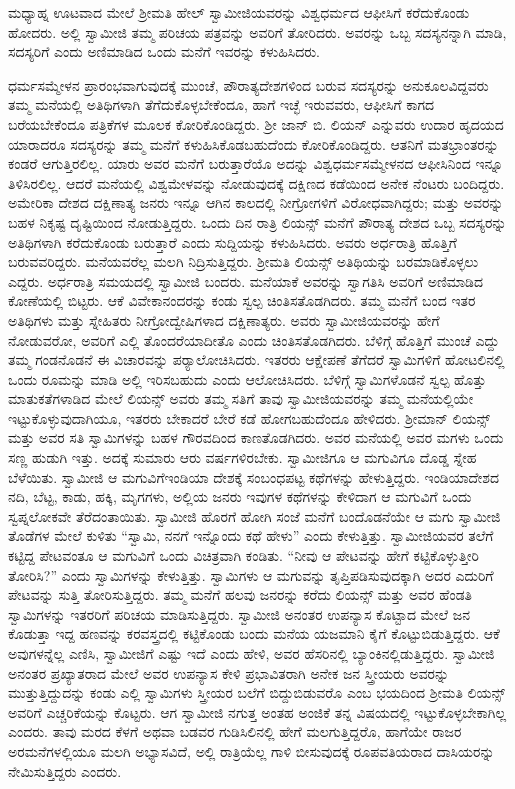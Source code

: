  ಮಧ್ಯಾಹ್ನ ಊಟವಾದ ಮೇಲೆ ಶ‍್ರೀಮತಿ ಹೇಲ್ ಸ್ವಾಮೀಜಿಯವರನ್ನು ವಿಶ್ವಧರ್ಮದ ಆಫೀಸಿಗೆ ಕರೆದುಕೊಂಡು ಹೋದರು. ಅಲ್ಲಿ ಸ್ವಾಮೀಜಿ ತಮ್ಮ ಪರಿಚಯ ಪತ್ರವನ್ನು ಅವರಿಗೆ ತೋರಿದರು. ಅವರನ್ನು ಒಬ್ಬ ಸದಸ್ಯನನ್ನಾಗಿ ಮಾಡಿ, ಸದಸ್ಯರಿಗೆ ಎಂದು ಅಣಿಮಾಡಿದ ಒಂದು ಮನೆಗೆ ಇವರನ್ನು ಕಳುಹಿಸಿದರು. 

 ಧರ್ಮಸಮ್ಮೇಳನ ಪ್ರಾರಂಭವಾಗುವುದಕ್ಕೆ ಮುಂಚೆ, ಪೌರಾತ್ಯದೇಶಗಳಿಂದ ಬರುವ ಸದಸ್ಯರನ್ನು ಅನುಕೂಲವಿದ್ದವರು ತಮ್ಮ ಮನೆಯಲ್ಲಿ ಅತಿಥಿಗಳಾಗಿ ತೆಗೆದುಕೊಳ್ಳಬೇಕೆಂದೂ, ಹಾಗೆ ಇಚ್ಛೆ ಇರುವವರು, ಆಫೀಸಿಗೆ ಕಾಗದ ಬರೆಯಬೇಕೆಂದೂ ಪತ್ರಿಕೆಗಳ ಮೂಲಕ ಕೋರಿಕೊಂಡಿದ್ದರು. ಶ‍್ರೀ ಜಾನ್ ಬಿ. ಲಿಯನ್ ಎನ್ನುವರು ಉದಾರ ಹೃದಯದ ಯಾರಾದರೂ ಸದಸ್ಯರನ್ನು ತಮ್ಮ ಮನೆಗೆ ಕಳುಹಿಸಿಕೊಡಬಹುದೆಂದು ಕೋರಿಕೊಂಡಿದ್ದರು. ಆತನಿಗೆ ಮತಭ್ರಾಂತರನ್ನು ಕಂಡರೆ ಆಗುತ್ತಿರಲಿಲ್ಲ. ಯಾರು ಅವರ ಮನೆಗೆ ಬರುತ್ತಾರೆಯೊ ಅದನ್ನು ವಿಶ್ವಧರ್ಮಸಮ್ಮೇಳನದ ಆಫೀಸಿನಿಂದ ಇನ್ನೂ ತಿಳಿಸಿರಲಿಲ್ಲ. ಆದರೆ ಮನೆಯಲ್ಲಿ ವಿಶ್ವಮೇಳವನ್ನು ನೋಡುವುದಕ್ಕೆ ದಕ್ಷಿಣದ ಕಡೆಯಿಂದ ಅನೇಕ ನೆಂಟರು ಬಂದಿದ್ದರು. ಅಮೇರಿಕಾ ದೇಶದ ದಕ್ಷಿಣಾತ್ಯ ಜನರು ಇನ್ನೂ ಆಗಿನ ಕಾಲದಲ್ಲಿ ನೀಗ್ರೋಗಳಿಗೆ ವಿರೋಧವಾಗಿದ್ದರು; ಮತ್ತು ಅವರನ್ನು ಬಹಳ ನಿಕೃಷ್ಟ ದೃಷ್ಟಿಯಿಂದ ನೋಡುತ್ತಿದ್ದರು. ಒಂದು ದಿನ ರಾತ್ರಿ ಲಿಯನ್ಸ್ ಮನೆಗೆ ಪೌರಾತ್ಯ ದೇಶದ ಒಬ್ಬ ಸದಸ್ಯರನ್ನು ಅತಿಥಿಗಳಾಗಿ ಕರೆದುಕೊಂಡು ಬರುತ್ತಾರೆ ಎಂದು ಸುದ್ದಿಯನ್ನು ಕಳುಹಿಸಿದರು. ಅವರು ಅರ್ಧರಾತ್ರಿ ಹೊತ್ತಿಗೆ ಬರುವವರಿದ್ದರು. ಮನೆಯವರೆಲ್ಲ ಮಲಗಿ ನಿದ್ರಿಸುತ್ತಿದ್ದರು. ಶ‍್ರೀಮತಿ ಲಿಯನ್ಸ್ ಅತಿಥಿಯನ್ನು ಬರಮಾಡಿಕೊಳ್ಳಲು ಎದ್ದರು. ಅರ್ಧರಾತ್ರಿ ಸಮಯದಲ್ಲಿ ಸ್ವಾಮೀಜಿ ಬಂದರು. ಮನೆಯಾಕೆ ಅವರನ್ನು ಸ್ವಾಗತಿಸಿ ಅವರಿಗೆ ಅಣಿಮಾಡಿದ ಕೋಣೆಯಲ್ಲಿ ಬಿಟ್ಟರು. ಆಕೆ ವಿವೇಕಾನಂದರನ್ನು ಕಂಡು ಸ್ವಲ್ಪ ಚಿಂತಿಸತೊಡಗಿದರು. ತಮ್ಮ ಮನೆಗೆ ಬಂದ ಇತರ ಅತಿಥಿಗಳು ಮತ್ತು ಸ್ನೇಹಿತರು ನೀಗ್ರೋದ್ವೇಷಿಗಳಾದ ದಕ್ಷಿಣಾತ್ಯರು. ಅವರು ಸ್ವಾಮೀಜಿಯವರನ್ನು ಹೇಗೆ ನೋಡುವರೋ, ಅವರಿಗೆ ಎಲ್ಲಿ ತೊಂದರೆಯಾದೀತೊ ಎಂದು ಚಿಂತಿಸತೊಡಗಿದರು. ಬೆಳಿಗ್ಗೆ ಹೊತ್ತಿಗೆ ಮುಂಚೆ ಎದ್ದು ತಮ್ಮ ಗಂಡನೊಡನೆ ಈ ವಿಚಾರವನ್ನು ಪರ‍್ಯಾಲೋಚಿಸಿದರು. ಇತರರು ಆಕ್ಷೇಪಣೆ ತೆಗೆದರೆ ಸ್ವಾಮಿಗಳಿಗೆ ಹೋಟಲಿನಲ್ಲಿ ಒಂದು ರೂಮನ್ನು ಮಾಡಿ ಅಲ್ಲಿ ಇರಿಸಬಹುದು ಎಂದು ಆಲೋಚಿಸಿದರು. ಬೆಳಿಗ್ಗೆ ಸ್ವಾಮಿಗಳೊಡನೆ ಸ್ವಲ್ಪ ಹೊತ್ತು ಮಾತುಕತೆಗಳಾಡಿದ ಮೇಲೆ ಲಿಯನ್ಸ್ ಅವರು ತಮ್ಮ ಸತಿಗೆ ತಾವು ಸ್ವಾಮೀಜಿಯವರನ್ನು ತಮ್ಮ ಮನೆಯಲ್ಲಿಯೇ ಇಟ್ಟುಕೊಳ್ಳುವುದಾಗಿಯೂ, ಇತರರು ಬೇಕಾದರೆ ಬೇರೆ ಕಡೆ ಹೋಗಬಹುದೆಂದೂ ಹೇಳಿದರು. ಶ‍್ರೀಮಾನ್ ಲಿಯನ್ಸ್ ಮತ್ತು ಅವರ ಸತಿ ಸ್ವಾಮಿಗಳನ್ನು ಬಹಳ ಗೌರವದಿಂದ ಕಾಣತೊಡಗಿದರು. ಅವರ ಮನೆಯಲ್ಲಿ ಅವರ ಮಗಳು ಒಂದು ಸಣ್ಣ ಹುಡುಗಿ ಇತ್ತು. ಅದಕ್ಕೆ ಸುಮಾರು ಆರು ವರ್ಷಗಳಿರಬೇಕು. ಸ್ವಾಮೀಜಿಗೂ ಆ ಮಗುವಿಗೂ ದೊಡ್ಡ ಸ್ನೇಹ ಬೆಳೆಯಿತು. ಸ್ವಾಮೀಜಿ ಆ ಮಗುವಿಗೆ\break ಇಂಡಿಯಾ ದೇಶಕ್ಕೆ ಸಂಬಂಧಪಟ್ಟ ಕಥೆಗಳನ್ನು ಹೇಳುತ್ತಿದ್ದರು. ಇಂಡಿಯಾದೇಶದ ನದಿ, ಬೆಟ್ಟ, ಕಾಡು, ಹಕ್ಕಿ, ಮೃಗಗಳು, ಅಲ್ಲಿಯ ಜನರು ಇವುಗಳ ಕಥೆಗಳನ್ನು ಕೇಳಿದಾಗ ಆ ಮಗುವಿಗೆ ಒಂದು ಸ್ವಪ್ನಲೋಕವೇ ತೆರೆದಂತಾಯಿತು. ಸ್ವಾಮೀಜಿ ಹೊರಗೆ ಹೋಗಿ ಸಂಜೆ ಮನೆಗೆ ಬಂದೊಡನೆಯೇ ಆ ಮಗು ಸ್ವಾಮೀಜಿ ತೊಡೆಗಳ ಮೇಲೆ ಕುಳಿತು “ಸ್ವಾಮಿ, ನನಗೆ ಇನ್ನೊಂದು ಕಥೆ ಹೇಳು” ಎಂದು ಕೇಳುತ್ತಿತ್ತು. ಸ್ವಾಮೀಜಿಯವರ ತಲೆಗೆ ಕಟ್ಟಿದ್ದ ಪೇಟವಂತೂ ಆ ಮಗುವಿಗೆ ಒಂದು ವಿಚಿತ್ರವಾಗಿ ಕಂಡಿತು. “ನೀವು ಆ ಪೇಟವನ್ನು ಹೇಗೆ ಕಟ್ಟಿಕೊಳ್ಳುತ್ತೀರಿ ತೋರಿಸಿ?” ಎಂದು ಸ್ವಾಮಿಗಳನ್ನು ಕೇಳುತ್ತಿತ್ತು. ಸ್ವಾಮಿಗಳು ಆ ಮಗುವನ್ನು ತೃಪ್ತಿಪಡಿಸುವುದಕ್ಕಾಗಿ ಅದರ ಎದುರಿಗೆ ಪೇಟವನ್ನು ಸುತ್ತಿ ತೋರಿಸುತ್ತಿದ್ದರು. ತಮ್ಮ ಮನೆಗೆ ಹಲವು ಜನರನ್ನು ಕರೆದು ಲಿಯನ್ಸ್ ಮತ್ತು ಅವರ ಹೆಂಡತಿ ಸ್ವಾಮಿಗಳನ್ನು ಇತರರಿಗೆ ಪರಿಚಯ ಮಾಡಿಸುತ್ತಿದ್ದರು. ಸ್ವಾಮೀಜಿ ಅನಂತರ ಉಪನ್ಯಾಸ ಕೊಟ್ಟಾದ ಮೇಲೆ ಜನ ಕೊಡುತ್ತಾ ಇದ್ದ ಹಣವನ್ನು ಕರವಸ್ತ್ರದಲ್ಲಿ ಕಟ್ಟಿಕೊಂಡು ಬಂದು ಮನೆಯ ಯಜಮಾನಿ ಕೈಗೆ ಕೊಟ್ಟುಬಿಡುತ್ತಿದ್ದರು. ಆಕೆ ಅವುಗಳನ್ನೆಲ್ಲ ಎಣಿಸಿ, ಸ್ವಾಮೀಜಿಗೆ ಎಷ್ಟು ಇದೆ ಎಂದು ಹೇಳಿ, ಅವರ ಹೆಸರಿನಲ್ಲಿ ಬ್ಯಾಂಕಿನಲ್ಲಿಡುತ್ತಿದ್ದರು. ಸ್ವಾಮೀಜಿ ಅನಂತರ ಪ್ರಖ್ಯಾತರಾದ ಮೇಲೆ ಅವರ ಉಪನ್ಯಾಸ ಕೇಳಿ ಪ್ರಭಾವಿತರಾಗಿ ಅನೇಕ ಜನ ಸ್ತ್ರೀಯರು ಅವರನ್ನು ಮುತ್ತುತ್ತಿದ್ದುದನ್ನು ಕಂಡು ಎಲ್ಲಿ ಸ್ವಾಮಿಗಳು ಸ್ತ್ರೀಯರ ಬಲೆಗೆ ಬಿದ್ದುಬಿಡುವರೊ ಎಂಬ ಭಯದಿಂದ ಶ‍್ರೀಮತಿ ಲಿಯನ್ಸ್ ಅವರಿಗೆ ಎಚ್ಚರಿಕೆಯನ್ನು ಕೊಟ್ಟರು. ಆಗ ಸ್ವಾಮೀಜಿ ನಗುತ್ತ ಅಂತಹ ಅಂಜಿಕೆ ತನ್ನ ವಿಷಯದಲ್ಲಿ ಇಟ್ಟುಕೊಳ್ಳಬೇಕಾಗಿಲ್ಲ ಎಂದರು. ತಾವು ಮರದ ಕೆಳಗೆ ಅಥವಾ ಬಡವರ ಗುಡಿಸಿಲಿನಲ್ಲಿ ಹೇಗೆ ಮಲಗುತ್ತಿದ್ದರೊ, ಹಾಗೆಯೇ ರಾಜರ ಅರಮನೆಗಳಲ್ಲಿಯೂ ಮಲಗಿ ಅಭ್ಯಾಸವಿದೆ, ಅಲ್ಲಿ ರಾತ್ರಿಯೆಲ್ಲ ಗಾಳಿ ಬೀಸುವುದಕ್ಕೆ ರೂಪವತಿಯರಾದ ದಾಸಿಯರನ್ನು ನೇಮಿಸುತ್ತಿದ್ದರು ಎಂದರು. 
